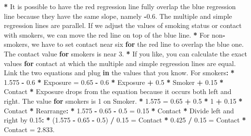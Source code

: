 \documentclass[a4paper]{book}
\newenvironment{Shaded}{\begin{snugshade}}{\end{snugshade}}
\newcommand{\DecValTok}[1]{\textcolor[rgb]{0.00,0.00,0.00}{#1}}
\newcommand{\FloatTok}[1]{\textcolor[rgb]{0.00,0.00,0.00}{#1}}
\newcommand{\StringTok}[1]{\textcolor[rgb]{0.00,0.00,0.00}{#1}}
\newcommand{\ControlFlowTok}[1]{\textcolor[rgb]{0.00,0.00,0.00}{\textbf{#1}}}
\newcommand{\OperatorTok}[1]{\textcolor[rgb]{0.00,0.00,0.00}{\textbf{#1}}}
\newcommand{\ErrorTok}[1]{\textcolor[rgb]{0.00,0.00,0.00}{\textbf{#1}}}
\newcommand{\NormalTok}[1]{#1}
\theoremstyle{definition}
\theoremstyle{definition}
\theoremstyle{definition}
\theoremstyle{remark}
\begin{document}
\begin{Shaded}
\begin{Highlighting}[]
\OperatorTok{*}\StringTok{ }\NormalTok{It is possible to have the red regression line fully overlap the blue}
\NormalTok{regression line because they have the same slope, namely }\OperatorTok{-}\FloatTok{0.6}\NormalTok{. The multiple}
\NormalTok{and simple regression lines are parallel. If we adjust the values of smoking}
\NormalTok{status or contact with smokers, we can move the red line on top of the blue}
\NormalTok{line.}
\OperatorTok{*}\StringTok{ }\NormalTok{For non}\OperatorTok{-}\NormalTok{smokers, we have to set contact near six }\ControlFlowTok{for}\NormalTok{ the red line to overlap}
\NormalTok{the blue one. The contact value }\ControlFlowTok{for}\NormalTok{ smokers is near }\DecValTok{3}\NormalTok{.}
\OperatorTok{*}\StringTok{ }\NormalTok{If you like, you can calculate the exact values }\ControlFlowTok{for}\NormalTok{ contact at which the}
\NormalTok{multiple and simple regression lines are equal. Link the two equations and plug}
\ControlFlowTok{in}\NormalTok{ the values that you know. For smokers}\OperatorTok{:}
\ErrorTok{*}\StringTok{ }\FloatTok{1.575} \OperatorTok{-}\StringTok{ }\FloatTok{0.6} \OperatorTok{*}\StringTok{ }\NormalTok{Exposure =}\StringTok{ }\FloatTok{0.65} \OperatorTok{-}\StringTok{ }\FloatTok{0.6} \OperatorTok{*}\StringTok{ }\NormalTok{Exposure }\OperatorTok{+}\StringTok{ }\FloatTok{0.5} \OperatorTok{*}\StringTok{ }\NormalTok{Smoker }\OperatorTok{+}\StringTok{ }\FloatTok{0.15} \OperatorTok{*}\StringTok{ }\NormalTok{Contact}
\OperatorTok{*}\StringTok{ }\NormalTok{Exposure drops from the equation because it occurs both left and right. The}
\NormalTok{value }\ControlFlowTok{for}\NormalTok{ smokers is }\DecValTok{1}\NormalTok{ on Smoker.}
\OperatorTok{*}\StringTok{ }\FloatTok{1.575}\NormalTok{ =}\StringTok{ }\FloatTok{0.65}  \OperatorTok{+}\StringTok{ }\FloatTok{0.5} \OperatorTok{*}\StringTok{ }\DecValTok{1} \OperatorTok{+}\StringTok{ }\FloatTok{0.15} \OperatorTok{*}\StringTok{ }\NormalTok{Contact}
\OperatorTok{*}\StringTok{ }\NormalTok{Rearrange}\OperatorTok{:}
\ErrorTok{*}\StringTok{ }\FloatTok{1.575} \OperatorTok{-}\StringTok{ }\FloatTok{0.65} \OperatorTok{-}\StringTok{ }\FloatTok{0.5}\NormalTok{ =}\StringTok{ }\FloatTok{0.15} \OperatorTok{*}\StringTok{ }\NormalTok{Contact}
\OperatorTok{*}\StringTok{ }\NormalTok{Divide left and right by }\FloatTok{0.15}\OperatorTok{:}
\ErrorTok{*}\StringTok{ }\NormalTok{(}\FloatTok{1.575} \OperatorTok{-}\StringTok{ }\FloatTok{0.65} \OperatorTok{-}\StringTok{ }\FloatTok{0.5}\NormalTok{) }\OperatorTok{/}\StringTok{ }\FloatTok{0.15}\NormalTok{ =}\StringTok{ }\NormalTok{Contact}
\OperatorTok{*}\StringTok{ }\FloatTok{0.425} \OperatorTok{/}\StringTok{ }\FloatTok{0.15}\NormalTok{ =}\StringTok{ }\NormalTok{Contact}
\OperatorTok{*}\StringTok{ }\NormalTok{Contact =}\StringTok{ }\FloatTok{2.833}\NormalTok{.}
\end{Highlighting}
\end{Shaded}
\end{document}
